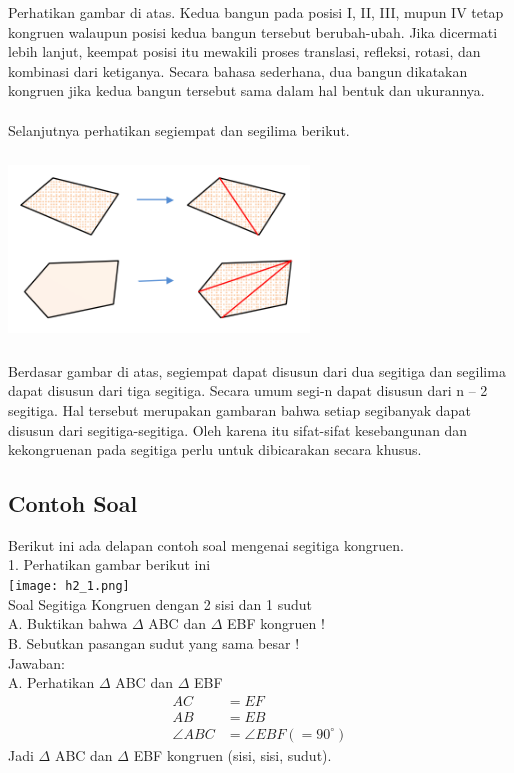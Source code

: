 \documentclass[11pt,fleqn]{book} %
\begin{document}
Perhatikan gambar di atas. Kedua bangun pada posisi I, II, III, mupun IV tetap
kongruen walaupun posisi kedua bangun tersebut berubah-ubah. Jika dicermati lebih
lanjut, keempat posisi itu mewakili proses translasi, refleksi, rotasi, dan kombinasi
dari ketiganya. Secara bahasa sederhana, dua bangun dikatakan kongruen jika kedua
bangun tersebut sama dalam hal bentuk dan ukurannya. 

\paragraph{}


Selanjutnya perhatikan segiempat dan segilima berikut. 

\includegraphics[width = 8cm, height= 5cm]{Pictures/3.png}

Berdasar gambar di atas, segiempat dapat disusun dari dua segitiga dan segilima
dapat disusun dari tiga segitiga. Secara umum segi-n dapat disusun dari n – 2 segitiga.
Hal tersebut merupakan gambaran bahwa setiap segibanyak dapat disusun dari segitiga-segitiga. Oleh karena itu sifat-sifat kesebangunan dan kekongruenan pada
segitiga perlu untuk dibicarakan secara khusus. 

\subsection{Contoh Soal}

Berikut ini ada delapan contoh soal mengenai segitiga kongruen.\\

1. Perhatikan gambar berikut ini\\
\texttt{[image: h2\_1.png]}\\
Soal Segitiga Kongruen dengan 2 sisi dan 1 sudut\\
A. Buktikan bahwa $\Delta$ ABC dan $\Delta$ EBF kongruen !\\
B. Sebutkan pasangan sudut yang sama besar !\\

Jawaban:\\
A. Perhatikan $\Delta$ ABC dan $\Delta$ EBF\\
    \begin{align*} AC &= EF \\ AB &= EB \\ \angle ABC &= \angle EBF (=90^{\circ}) \end{align*}
Jadi $\Delta$ ABC dan $\Delta$ EBF kongruen (sisi, sisi, sudut).\\
\end{document}
